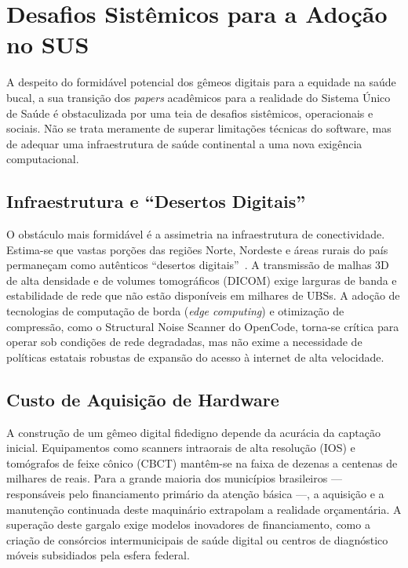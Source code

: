 \section{Desafios Sistêmicos para a Adoção no SUS}

A despeito do formidável potencial dos gêmeos digitais para a equidade na saúde bucal, a sua transição dos \textit{papers} acadêmicos para a realidade do Sistema Único de Saúde é obstaculizada por uma teia de desafios sistêmicos, operacionais e sociais. Não se trata meramente de superar limitações técnicas do software, mas de adequar uma infraestrutura de saúde continental a uma nova exigência computacional.

\subsection{Infraestrutura e ``Desertos Digitais''}
O obstáculo mais formidável é a assimetria na infraestrutura de conectividade. Estima-se que vastas porções das regiões Norte, Nordeste e áreas rurais do país permaneçam como autênticos ``desertos digitais''~\cite{cuadros2023assessing}. A transmissão de malhas 3D de alta densidade e de volumes tomográficos (DICOM) exige larguras de banda e estabilidade de rede que não estão disponíveis em milhares de UBSs. A adoção de tecnologias de computação de borda (\textit{edge computing}) e otimização de compressão, como o Structural Noise Scanner do OpenCode, torna-se crítica para operar sob condições de rede degradadas, mas não exime a necessidade de políticas estatais robustas de expansão do acesso à internet de alta velocidade.

\subsection{Custo de Aquisição de Hardware}
A construção de um gêmeo digital fidedigno depende da acurácia da captação inicial. Equipamentos como scanners intraorais de alta resolução (IOS) e tomógrafos de feixe cônico (CBCT) mantêm-se na faixa de dezenas a centenas de milhares de reais. Para a grande maioria dos municípios brasileiros — responsáveis pelo financiamento primário da atenção básica —, a aquisição e a manutenção continuada deste maquinário extrapolam a realidade orçamentária. A superação deste gargalo exige modelos inovadores de financiamento, como a criação de consórcios intermunicipais de saúde digital ou centros de diagnóstico móveis subsidiados pela esfera federal.

